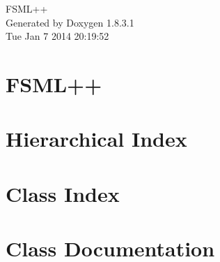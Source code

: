 \documentclass{book}
\begin{document}
\hypersetup{pageanchor=false,citecolor=blue}
\begin{titlepage}
\vspace*{7cm}
\begin{center}
{\Large F\-S\-M\-L++ }\\
\vspace*{1cm}
{\large Generated by Doxygen 1.8.3.1}\\
\vspace*{0.5cm}
{\small Tue Jan 7 2014 20:19:52}\\
\end{center}
\end{titlepage}
\clearemptydoublepage
{}
\tableofcontents
\clearemptydoublepage
{}
\hypersetup{pageanchor=true,citecolor=blue}
\chapter{F\-S\-M\-L++}
\label{md_README}
\hypertarget{md_README}{}

\chapter{Hierarchical Index}

\chapter{Class Index}

\chapter{Class Documentation}


















\printindex
\end{document}
